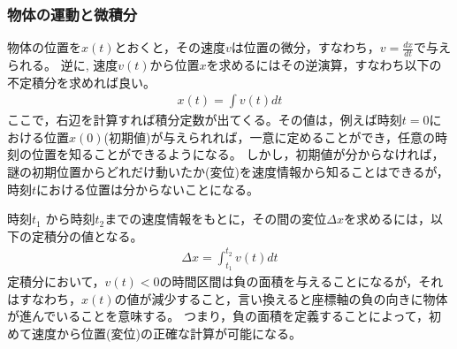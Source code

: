 \documentclass[twocolumn,11pt]{jarticle}
\begin{document}
\subsubsection{物体の運動と微積分}
物体の位置を$x(t)$とおくと，その速度$v$は位置の微分，すなわち，$v=\frac{dx}{dt}$で与えられる。
逆に, 速度$v(t)$から位置$x$を求めるにはその逆演算，すなわち以下の不定積分を求めれば良い。
\begin{align*}
x(t)=\int v(t)dt
\end{align*}
ここで，右辺を計算すれば積分定数が出てくる。その値は，例えば時刻$t=0$における位置$x(0)$(初期値)が与えられれば，一意に定めることができ，任意の時刻の位置を知ることができるようになる。
しかし，初期値が分からなければ，謎の初期位置からどれだけ動いたか(変位)を速度情報から知ることはできるが，時刻$t$における位置は分からないことになる。

時刻$t_1$ から時刻$t_2$までの速度情報をもとに，その間の変位$\Delta x$を求めるには，以下の定積分の値となる。
\begin{align*}
  \Delta x=\int_{t_1}^{t_2}v(t)dt
\end{align*}
定積分において，$v(t)<0$の時間区間は負の面積を与えることになるが，それはすなわち，$x(t)$の値が減少すること，言い換えると座標軸の負の向きに物体が進んでいることを意味する。
つまり，負の面積を定義することによって，初めて速度から位置(変位)の正確な計算が可能になる。
\end{document}
